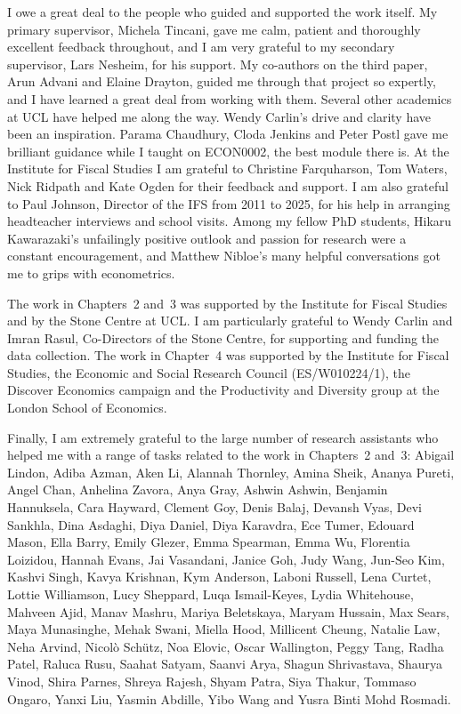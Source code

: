 \documentclass[12pt, a4paper]{report}
\begin{document}
I owe a great deal to the people who guided and supported the work itself.
My primary supervisor, Michela Tincani, gave me calm, patient and thoroughly
excellent feedback throughout, and I am very grateful to my secondary
supervisor, Lars Nesheim, for his support. My co-authors on the third
paper, Arun Advani and Elaine Drayton, guided me through that project so
expertly, and I have learned a great deal from working with them. Several
other academics at UCL have helped me along the way. Wendy Carlin's drive
and clarity have been an inspiration. Parama Chaudhury, Cloda Jenkins and
Peter Postl gave me brilliant guidance while I taught on ECON0002, the best
module there is. At the Institute for Fiscal Studies I am grateful to
Christine Farquharson, Tom Waters, Nick Ridpath and Kate Ogden for their
feedback and support. I am also grateful to Paul Johnson, Director of the
IFS from 2011 to 2025, for his help in arranging headteacher interviews and
school visits. Among my fellow PhD students, Hikaru Kawarazaki's
unfailingly positive outlook and passion for research were a constant
encouragement, and Matthew Nibloe's many helpful conversations got me to
grips with econometrics.

The work in Chapters~2 and~3 was supported by the Institute for Fiscal
Studies and by the Stone Centre at UCL. I am particularly grateful to Wendy
Carlin and Imran Rasul, Co-Directors of the Stone Centre, for supporting and
funding the data collection. The work in Chapter~4 was supported by the
Institute for Fiscal Studies, the Economic and Social Research Council
(ES/W010224/1), the Discover Economics campaign and the Productivity and
Diversity group at the London School of Economics.

Finally, I am extremely grateful to the large number of research assistants
who helped me with a range of tasks related to the work in Chapters~2
and~3: Abigail Lindon, Adiba
Azman, Aken Li, Alannah Thornley, Amina Sheik, Ananya Pureti, Angel Chan,
Anhelina Zavora, Anya Gray, Ashwin Ashwin, Benjamin Hannuksela, Cara
Hayward, Clement Goy, Denis Balaj, Devansh Vyas, Devi Sankhla, Dina
Asdaghi, Diya Daniel, Diya Karavdra, Ece Tumer, Edouard Mason, Ella Barry,
Emily Glezer, Emma Spearman, Emma Wu, Florentia Loizidou, Hannah Evans, Jai
Vasandani, Janice Goh, Judy Wang, Jun-Seo Kim, Kashvi Singh, Kavya
Krishnan, Kym Anderson, Laboni Russell, Lena Curtet, Lottie Williamson,
Lucy Sheppard, Luqa Ismail-Keyes, Lydia Whitehouse, Mahveen Ajid, Manav
Mashru, Mariya Beletskaya, Maryam Hussain, Max Sears,
Maya Munasinghe, Mehak Swani, Miella Hood, Millicent Cheung, Natalie Law,
Neha Arvind, Nicol\`o Sch\"utz, Noa Elovic, Oscar Wallington, Peggy Tang, Radha
Patel, Raluca Rusu, Saahat Satyam, Saanvi Arya, Shagun Shrivastava,
Shaurya Vinod, Shira Parnes, Shreya Rajesh, Shyam Patra, Siya Thakur,
Tommaso Ongaro, Yanxi Liu, Yasmin Abdille, Yibo Wang and Yusra Binti Mohd
Rosmadi.
\end{document}
